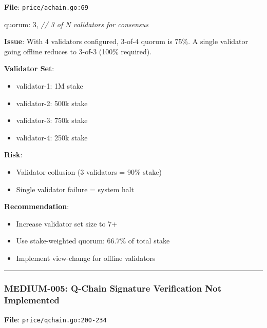 \documentclass[
]{article}
\newenvironment{Shaded}{}{}
\newcommand{\CommentTok}[1]{\textcolor[rgb]{0.38,0.63,0.69}{\textit{#1}}}
\newcommand{\DecValTok}[1]{\textcolor[rgb]{0.25,0.63,0.44}{#1}}
\newcommand{\NormalTok}[1]{#1}
\newcommand{\OperatorTok}[1]{\textcolor[rgb]{0.40,0.40,0.40}{#1}}
\providecommand{\tightlist}{%
  \setlength{\itemsep}{0pt}\setlength{\parskip}{0pt}}
\begin{document}
\textbf{File}: \texttt{price/achain.go:69}

\begin{Shaded}
\begin{Highlighting}[]
\NormalTok{quorum}\OperatorTok{:} \DecValTok{3}\OperatorTok{,} \CommentTok{// 3 of N validators for consensus}
\end{Highlighting}
\end{Shaded}

\textbf{Issue}: With 4 validators configured, 3-of-4 quorum is 75\%. A
single validator going offline reduces to 3-of-3 (100\% required).

\textbf{Validator Set}:

\begin{itemize}
\tightlist
\item
  validator-1: 1M stake
\item
  validator-2: 500k stake
\item
  validator-3: 750k stake
\item
  validator-4: 250k stake
\end{itemize}

\textbf{Risk}:

\begin{itemize}
\tightlist
\item
  Validator collusion (3 validators = 90\% stake)
\item
  Single validator failure = system halt
\end{itemize}

\textbf{Recommendation}:

\begin{itemize}
\tightlist
\item
  Increase validator set size to 7+
\item
  Use stake-weighted quorum: 66.7\% of total stake
\item
  Implement view-change for offline validators
\end{itemize}

\begin{center}\rule{0.5\linewidth}{0.5pt}\end{center}

\subsubsection{MEDIUM-005: Q-Chain Signature Verification Not
Implemented}\label{medium-005-q-chain-signature-verification-not-implemented}

\textbf{File}: \texttt{price/qchain.go:200-234}
\end{document}
